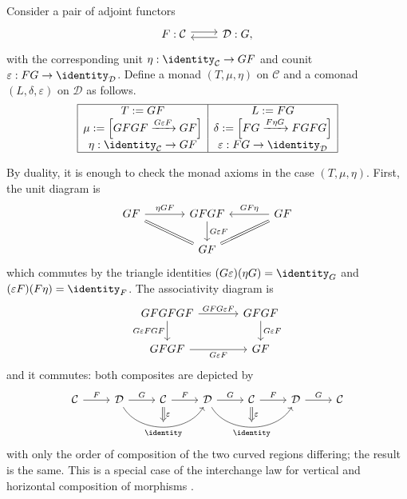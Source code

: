 \begin{example}\label{eg:adjunction-monad}
	Consider a pair of adjoint functors
	\[\begin{tikzcd}
		F: \mathcal{C} \arrow[shift left, r] & \mathcal{D}: G \arrow[shift left, l],
	\end{tikzcd}\]
	with the corresponding unit $\eta:\identity_{\mathcal{C}}\to GF$ and
	counit $\varepsilon:FG\to\identity_{\mathcal{D}}$. Define a monad
	$(T,\mu,\eta)$ on $\mathcal{C}$ and a comonad
	$(L,\delta,\varepsilon)$ on $\mathcal{D}$ as follows.
	\[\begin{array}{|c|c|}\hline
		T := GF & L := FG \\
		\mu := \left[ GFGF \xrightarrow{G\varepsilon F} GF \right] & \delta := \left[ FG \xrightarrow{F\eta G} FGFG \right] \\
		\eta : \identity_{\mathcal{C}} \to GF & \varepsilon: FG \to \identity_{\mathcal{D}} \\ \hline
	\end{array}\]

	By duality, it is enough to check the monad axioms in the case
	$(T,\mu,\eta)$. First, the unit diagram is
	\[\begin{tikzcd}[column sep=large]
		GF \arrow[r, "{\eta GF}"] \arrow[equal, rd] & GFGF \arrow[d, "{G\varepsilon F}"] & GF \arrow[l, "{GF\eta}"'] \arrow[equal, ld] \\
		& GF &
	\end{tikzcd}\]
	which commutes by the triangle identities
	$(G\varepsilon)(\eta G)=\identity_G$ and
	$(\varepsilon F)(F\eta)=\identity_F$. The associativity diagram is
	\[\begin{tikzcd}[column sep=large]
		GFGFGF \arrow[d, "{G\varepsilon FGF}"'] \arrow[r, "{GFG\varepsilon F}"] & GFGF \arrow[d, "G\varepsilon F"] \\
		GFGF \arrow[r, "G\varepsilon F"'] & GF
	\end{tikzcd}\]
	and it commutes: both composites are depicted by
	\[\begin{tikzcd}
		\mathcal{C} \arrow[r, "F"] & \mathcal{D} \arrow[r, "G"] \arrow[rr, bend right=60, ""{name=A}, "{\identity}"'] & \mathcal{C} \arrow[r, "F"] \arrow[Rightarrow, to=A, "\varepsilon"] &
		\mathcal{D} \arrow[r, "G"] \arrow[rr, bend right=60, ""{name=B}, "{\identity}"'] & \mathcal{C} \arrow[r, "F"] \arrow[Rightarrow, to=B, "\varepsilon"] & \mathcal{D} \arrow[r, "G"] & \mathcal{C}
	\end{tikzcd}\]
	with only the order of composition of the two curved regions differing;
	the result is the same. This is a special case of the interchange law for
	vertical and horizontal composition of morphisms
	\cite[Lemma 2.2.7]{Li1}.
\end{example}

